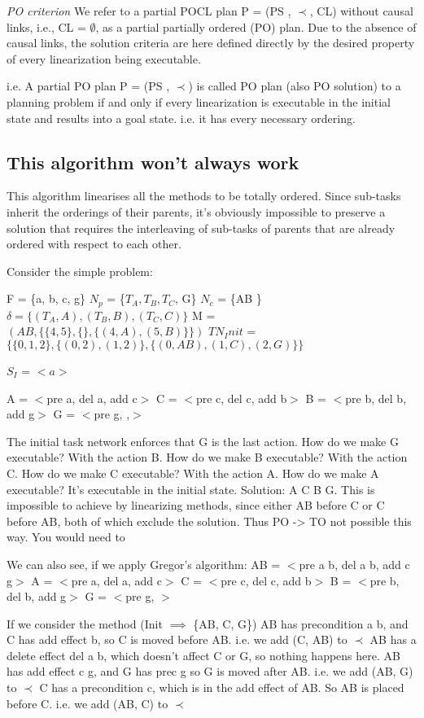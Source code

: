 \emph{PO criterion} We refer to a partial POCL plan P = (PS , $\prec$, CL) without causal links, i.e., CL = $\emptyset$, as a partial partially ordered (PO) plan. Due to the absence of causal links, the solution criteria are here defined directly by the desired property of every linearization being executable.

i.e. A partial PO plan P = (PS , $\prec$) is called PO plan (also PO solution) to a planning problem if and only
if every linearization is executable in the initial state and results into a goal state.
i.e. it has every necessary ordering.



\subsection{This algorithm won't always work}
This algorithm linearises all the methods to be totally ordered.
Since sub-tasks inherit the orderings of their parents, it's obviously impossible to preserve a solution that requires the interleaving of sub-tasks of parents that are already ordered with respect to each other.

Consider the simple problem:

F = \{a, b, c, g\}
$N_p$ = \{$T_A, T_B, T_C$, G\}
$N_c$ = \{AB \}
$\delta = \{ (T_A, A), (T_B, B), (T_C, C) \}$
M = $(AB,  \{ \{4,5\}, \{\}, \{(4,A), (5,B)\} \} )$
$TN_Init$ = $\{ \{0,1,2\},  \{(0,2), (1,2)\}, \{(0,AB), (1,C), (2,G)\} \}$
	
	
$S_I$ = $<a>$
	
	A = $<$pre a, del a, add c$>$
	C = $<$pre c, del c, add b$>$
	B = $<$pre b, del b, add g$>$
	G = $<$pre g, ,$>$
	
	The initial task network enforces that G is the last action.
	How do we make G executable? With the action B.
	How do we make B executable? With the action C.
	How do we make C executable? With the action A.
	How do we make A executable? It's executable in the initial state.
	Solution: A C B G.
	This is impossible to achieve by linearizing methods, since either AB before C or C before AB, both of which exclude the solution.
	Thus PO -> TO not possible this way. You would need to 
	
	We can also see, if we apply Gregor's algorithm:
	AB = $<$pre a b, del a b, add c g$>$
	A = $<$pre a, del a, add c$>$
	C = $<$pre c, del c, add b$>$
	B = $<$pre b, del b, add g$>$
	G = $<$pre g, $>$
	
	If we consider the method (Init $\implies$ \{AB, C, G\})
	AB has precondition a b, and C has add effect b, so C is moved before AB.             i.e. we add (C, AB) to $\prec$
	AB has a delete effect del a b, which doesn't affect C or G, so nothing happens here.
	AB has add effect c g, and G has prec g so G is moved after AB.	                      i.e. we add (AB, G) to $\prec$
	C has a precondition c, which is in the add effect of AB.  So AB is placed before C.   i.e. we add (AB, C) to $\prec$
	
